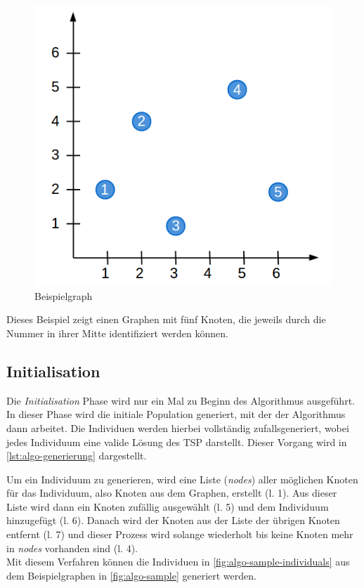 \documentclass[12pt,a4paper]{scrreprt}
\newcommand{\includecode}[3]{}
\newcommand{\absatz}{\\[12pt]}
\begin{document}
\begin{figure}[ht]
  	\centering
	\includegraphics[width=400pt]{images/algo_01_sample.png}
	\caption{Beispielgraph}
	\label{fig:algo-sample}
\end{figure}

Dieses Beispiel zeigt einen Graphen mit fünf Knoten, die jeweils durch die Nummer in ihrer Mitte identifiziert werden können.

\subsection{Initialisation}
\label{subsec:initialisation}

Die \textit{Initialisation} Phase wird nur ein Mal zu Beginn des Algorithmus ausgeführt. In dieser Phase wird die initiale Population generiert, mit der der Algorithmus dann arbeitet. Die Individuen werden hierbei vollständig zufallsgeneriert, wobei jedes Individuum eine valide Lösung des TSP darstellt. Dieser Vorgang wird in \autoref{lst:algo-generierung} dargestellt.

\includecode{lst:algo-generierung}{Generierung eines Individuums}{code/algo_01_generierung.pseudo}

Um ein Individuum zu generieren, wird eine Liste (\textit{nodes}) aller möglichen Knoten für das Individuum, also Knoten aus dem Graphen, erstellt (l. 1). Aus dieser Liste wird dann ein Knoten zufällig ausgewählt (l. 5) und dem Individuum hinzugefügt (l. 6). Danach wird der Knoten aus der Liste der übrigen Knoten entfernt (l. 7) und dieser Prozess wird solange wiederholt bis keine Knoten mehr in \textit{nodes} vorhanden sind (l. 4).\absatz
Mit diesem Verfahren können die Individuen in \autoref{fig:algo-sample-individuals} aus dem Beispielgraphen in \autoref{fig:algo-sample} generiert werden.
\end{document}
